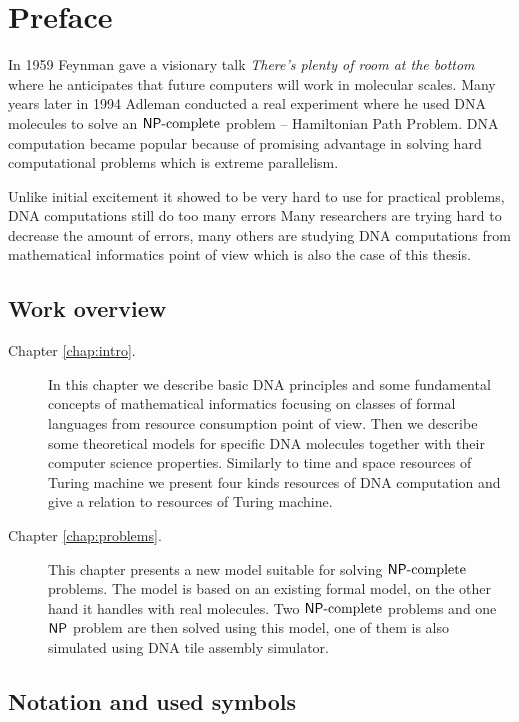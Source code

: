 \cleardoublepage{}   %
\chapter*{Preface}

In 1959 Feynman gave a visionary talk {\em There's plenty of room at the bottom} \cite{feynman} where he anticipates that future computers will work in molecular scales. Many years later in 1994 Adleman conducted a real experiment \cite{adleman94} where he used DNA molecules to solve an $\mathsf{NP}\textnormal{-complete}$ problem -- Hamiltonian Path Problem. DNA computation became popular because of promising advantage in solving hard computational problems which is extreme parallelism.

Unlike initial excitement it showed to be very hard to use for practical problems, DNA computations still do too many errors %
Many researchers are trying hard to decrease the amount of errors, many others are studying DNA computations from mathematical informatics point of view which is also the case of this thesis.

\section*{Work overview}
	
	\begin{description}
		\item[Chapter \ref{chap:intro}.] In this chapter we describe basic DNA principles and some fundamental concepts of mathematical informatics focusing on classes of formal languages from resource consumption point of view. Then we describe some theoretical models for specific DNA molecules together with their computer science properties. Similarly to time and space resources of Turing machine we present four kinds resources of DNA computation and give a relation to resources of Turing machine.
		\item[Chapter \ref{chap:problems}.] This chapter presents a new model suitable for solving $\mathsf{NP}\textnormal{-complete}$ problems. The model is based on an existing formal model, on the other hand it handles with real molecules. Two $\mathsf{NP}\textnormal{-complete}$ problems and one $\mathsf{NP}$ problem are then solved using this model, one of them is also simulated using DNA tile assembly simulator.
	\end{description}

\section*{Notation and used symbols}
	
